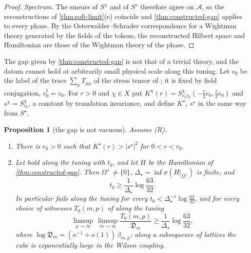 \documentclass[11pt,a4paper]{amsart}
\newtheorem{proposition}[theorem]{Proposition}
\theoremstyle{definition}
\theoremstyle{remark}
\numberwithin{equation}{section}
\newcommand{\abs}[1]{\lvert #1\rvert}      %
\newcommand{\Mcirc}{\text{\upshape(M$^{\circ}$)}}   %
\newcommand{\tzero}{t_0}                   %
\newcommand{\Den}{\mathfrak D}            %
\begin{document}
\begin{proof}
\emph{Spectrum.} The smears of $S^\chi$ and of $S^\star$ therefore agree on $\mathcal A$, so the reconstructions of \cref{thm:soft-limit}(e) coincide and \cref{thm:constructed-gap} applies to every phase. By the Osterwalder--Schrader correspondence for a Wightman theory generated by the fields of the tokens, the reconstructed Hilbert space and Hamiltonian are those of the Wightman theory of the phase.
\end{proof}

The gap given by \cref{thm:constructed-gap} is not that of a trivial theory, and the datum cannot hold at arbitrarily small physical scale along this tuning. Let $v_0$ be the label of the trace $\sum_\mu T_{\mu\mu}$ of the stress tensor of \cite[Section~7.1]{ymgroup2026}; it is fixed by field conjugation, $v_0^\natural=v_0$. For $r>0$ and $\chi\in X$ put $K^\chi(r)=S^\chi_{v_0v_0}(-\frac r2e_0,\frac r2e_0)$ and $s^\chi=S^\chi_{v_0}$, a constant by translation invariance, and define $K^\star$, $s^\star$ in the same way from $S^\star$.

\begin{proposition}[the gap is not vacuous]\label{prop:constructed-nontrivial}
Assume \textup{(R)}.
\begin{enumerate}[label=\textup{(\alph*)},leftmargin=*]
\item There is $r_0>0$ such that $K^\star(r)>\abs{s^\star}^2$ for $0<r<r_0$.
\item Let \Mcirc{} hold along the tuning with $\tzero$, and let $H$ be the Hamiltonian of \cref{thm:constructed-gap}. Then $\Omega^\perp\ne\{0\}$, $\Delta_\star=\inf\sigma(H|_{\Omega^\perp})$ is finite, and
\[
\tzero\ge\frac{1}{\Delta_\star}\log\frac{63}{32}.
\]
In particular \Mcirc{} fails along the tuning for every $\tzero<\Delta_\star^{-1}\log\frac{63}{32}$, and for every choice of witnesses $T_0(m,p)$ of \Mcirc{} along the tuning
\[
\limsup_{p\to\infty}\,\limsup_{m\to\infty}\frac{T_0(m,p)}{\Den_m}\ge\frac{1}{\Delta_\star}\log\frac{63}{32},
\]
where $\log \Den_m=(\kappa^{-1}+o(1))\,\beta_{m,p}$: along a subsequence of lattices the cube is exponentially large in the Wilson coupling.
\end{enumerate}
\end{proposition}
\end{document}
